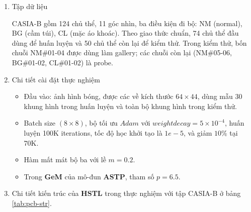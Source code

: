 \begin{enumerate}
    \item Tập dữ liệu

          CASIA-B gồm 124 chủ thể, 11 góc nhìn, ba điều kiện đi bộ: NM (normal), BG (cầm túi), CL (mặc áo khoác). Theo giao thức chuẩn, 74 chủ thể đầu dùng để huấn luyện và 50 chủ thể còn lại để kiểm thử. Trong kiểm thử, bốn chuỗi NM\#01-04 được dùng làm gallery; các chuỗi còn lại (NM\#05-06, BG\#01-02, CL\#01-02) là probe.

    \item Chi tiết cài đặt thực nghiệm

          \begin{itemize}

              \item Đầu vào: ảnh hình bóng, được các về kích thước $64 \times 44$, dùng mẫu 30 khung hình trong huấn luyện và toàn bộ khung hình trong kiểm thử.
              \item Batch size $(8 \times 8)$, bộ tối ưu  $Adam$ với $weight decay = 5 \times 10 ^{-4}$, huấn luyện 100K iterations, tốc độ học khởi tạo là $1e-5$, và giảm $10\%$ tại 70K.
              \item Hàm mất mát bộ ba với lề $ m =0.2$.
              \item Trong \textbf{GeM} của mô-đun \textbf{ASTP}, tham số $p=6.5$.

          \end{itemize}

    \item Chi tiết kiến trúc của \textbf{HSTL} trong thực nghiệm với tập CASIA-B ở bảng \ref{tab:pcb-str}.


\end{enumerate}
